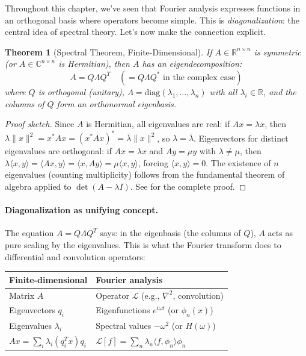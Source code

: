 \documentclass[12pt,a4paper]{report}
\theoremstyle{thms}
\newtheorem{theorem}{Theorem}[section]
\theoremstyle{defns}
\begin{document}
Throughout this chapter, we've seen that Fourier analysis expresses functions in an orthogonal basis where operators become simple. This is \textit{diagonalization}: the central idea of spectral theory. Let's now make the connection explicit.

\begin{theorem}[Spectral Theorem, Finite-Dimensional]
    If $A \in \mathbb{R}^{n \times n}$ is symmetric (or $A \in \mathbb{C}^{n \times n}$ is Hermitian), then $A$ has an eigendecomposition:
    \begin{equation}
        A = Q\Lambda Q^T \quad (= Q\Lambda Q^* \text{ in the complex case})
    \end{equation}
    where $Q$ is orthogonal (unitary), $\Lambda = \mathrm{diag}(\lambda_1, \ldots, \lambda_n)$ with all $\lambda_i \in \mathbb{R}$, and the columns of $Q$ form an orthonormal eigenbasis.
    \label{thm:spectral}
\end{theorem}

\begin{proof}[Proof sketch]
    Since $A$ is Hermitian, all eigenvalues are real: if $Ax = \lambda x$, then $\lambda \|x\|^2 = x^*Ax = (x^*Ax)^* = \bar{\lambda}\|x\|^2$, so $\lambda = \bar{\lambda}$. Eigenvectors for distinct eigenvalues are orthogonal: if $Ax = \lambda x$ and $Ay = \mu y$ with $\lambda \neq \mu$, then $\lambda \langle x, y \rangle = \langle Ax, y \rangle = \langle x, Ay \rangle = \mu \langle x, y \rangle$, forcing $\langle x, y \rangle = 0$. The existence of $n$ eigenvalues (counting multiplicity) follows from the fundamental theorem of algebra applied to $\det(A - \lambda I)$. See \cite{axler_linear} for the complete proof.
\end{proof}

\paragraph{Diagonalization as unifying concept.} The equation $A = Q\Lambda Q^T$ says: in the eigenbasis (the columns of $Q$), $A$ acts as pure scaling by the eigenvalues. This is what the Fourier transform does to differential and convolution operators:

\begin{center}
    \begin{tabular}{l l}
        \hline
        \textbf{Finite-dimensional} & \textbf{Fourier analysis} \\
        \hline
        Matrix $A$ & Operator $\mathcal{L}$ (e.g., $\nabla^2$, convolution) \\
        Eigenvectors $q_i$ & Eigenfunctions $e^{i\omega t}$ (or $\phi_n(x)$) \\
        Eigenvalues $\lambda_i$ & Spectral values $-\omega^2$ (or $H(\omega)$) \\
        $Ax = \sum_i \lambda_i (q_i^T x) q_i$ & $\mathcal{L}[f] = \sum_n \lambda_n \langle f, \phi_n \rangle \phi_n$ \\
        \hline
    \end{tabular}
\end{center}
\end{document}
